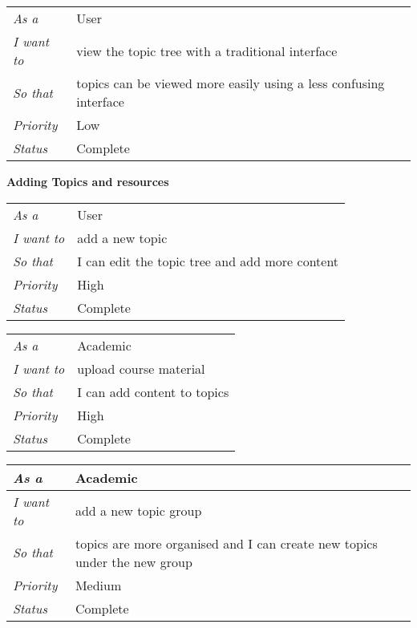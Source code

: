 \begin{table}[]
\begin{tabular}{ll}
\textit{As a}      & User                                                              \\
\textit{I want to} & view the topic tree with a traditional interface                  \\
\textit{So that}   & topics can be viewed more easily using a less confusing interface \\
\textit{Priority}  & {\color[HTML]{3166FF} Low}                                        \\
\textit{Status}    & Complete                                                         
\end{tabular}
\end{table}

\textbf{Adding Topics and resources}
\begin{table}[]
\begin{tabular}{ll}
\textit{As a}      & User                                           \\
\textit{I want to} & add a new topic                                \\
\textit{So that}   & I can edit the topic tree and add more content \\
\textit{Priority}  & {\color[HTML]{FE0000} High}                    \\
\textit{Status}    & Complete                                      
\end{tabular}
\end{table}

\begin{table}[]
\begin{tabular}{ll}
\textit{As a}      & Academic                       \\
\textit{I want to} & upload course material      \\
\textit{So that}   & I can add content to topics       \\
\textit{Priority}  & {\color[HTML]{FE0000} High} \\
\textit{Status}    & Complete                   
\end{tabular}
\end{table}

\begin{table}[]
\begin{tabular}{|l|l|}
\hline
\textit{As a}      & Academic                                                                      \\ \hline
\textit{I want to} & add a new topic group                                                     \\ \hline
\textit{So that}   & topics are more organised and I can create new topics under the new group \\ \hline
\textit{Priority}  & {\color[HTML]{F8A102} Medium}                                             \\ \hline
\textit{Status}    & Complete                                                                  \\ \hline
\end{tabular}
\end{table}

